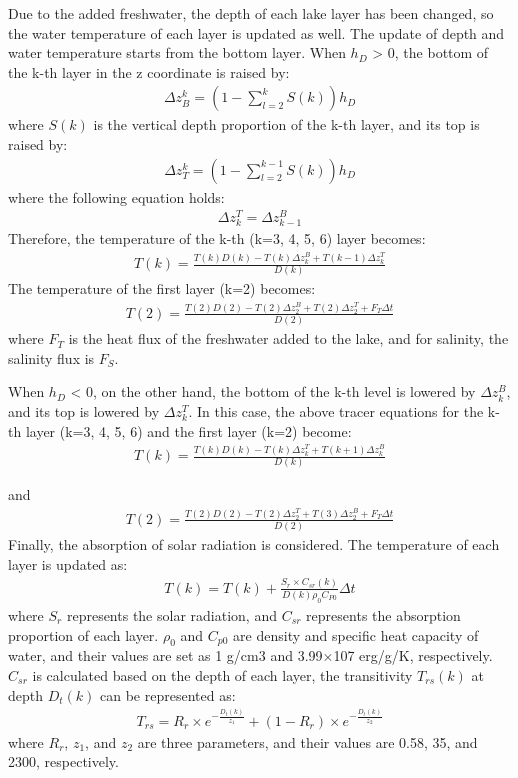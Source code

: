 Due to the added freshwater, the depth of each lake layer has been changed, so the water temperature of each layer is updated as well. The update of depth and water temperature starts from the bottom
layer. When \(h_{D}\) \textgreater{} 0, the bottom of the k-th layer in the z coordinate is raised by: \begin{eqnarray}
\Delta z_{B}^{k}=(1-\sum_{l=2}^{k}S(k))h_{D}
\end{eqnarray} where \(S(k)\) is the vertical depth proportion of the k-th layer, and its top is raised by: \begin{eqnarray}
\Delta z_{T}^{k}=(1-\sum_{l=2}^{k-1}S(k))h_{D}
\end{eqnarray} where the following equation holds: \begin{eqnarray}
\Delta z_{k}^{T}=\Delta z_{k-1}^{B}
\end{eqnarray} Therefore, the temperature of the k-th (k=3, 4, 5, 6) layer becomes: \begin{eqnarray}
T(k)=\frac{T(k)D(k)-T(k)\Delta z_{k}^{B}+T(k-1)\Delta z_{k}^{T}}{D(k)}
\end{eqnarray} The temperature of the first layer (k=2) becomes: \begin{eqnarray}
T(2)=\frac{T(2)D(2)-T(2)\Delta z_{2}^{B}+T(2)\Delta z_{2}^{T}+F_{T}\Delta t}{D(2)}
\end{eqnarray} where \(F_{T}\) is the heat flux of the freshwater added to the lake, and for salinity, the salinity flux is \(F_{S}\).

When \(h_{D}\) \textless{} 0, on the other hand, the bottom of the k-th level is lowered by \(\Delta z_{k}^{B}\), and its top is lowered by \(\Delta z_{k}^{T}\). In this case, the above tracer
equations for the k-th layer (k=3, 4, 5, 6) and the first layer (k=2) become: \begin{eqnarray}
T(k)=\frac{T(k)D(k)-T(k)\Delta z_{k}^{T}+T(k+1)\Delta z_{k}^{B}}{D(k)}
\end{eqnarray}

and \begin{eqnarray}
T(2)=\frac{T(2)D(2)-T(2)\Delta z_{2}^{T}+T(3)\Delta z_{2}^{B}+F_{T}\Delta t}{D(2)}
\end{eqnarray} Finally, the absorption of solar radiation is considered. The temperature of each layer is updated as: \begin{eqnarray}
T(k)=T(k)+\frac{S_{r}\times C_{sr}(k)}{D(k)\rho _{0}C_{P0}}\Delta t
\end{eqnarray} where \(S_{r}\) represents the solar radiation, and \(C_{sr}\) represents the absorption proportion of each layer. \(\rho_{0}\) and \(C_{p0}\) are density and specific heat capacity of water, and
their values are set as 1 g/cm3 and 3.99×107 erg/g/K, respectively. \(C_{sr}\) is calculated based on the depth of each layer, the transitivity \(T_{rs}(k)\) at depth \(D_{t}(k)\) can be represented
as: \begin{eqnarray}
T_{rs}=R_{r}\times e^{-\frac{D_{t}(k)}{z_{1}}}+(1-R_{r})\times e^{-\frac{D_{t}(k)}{z_{2}}}
\end{eqnarray} where \(R_{r}\), \(z_{1}\), and \(z_{2}\) are three parameters, and their values are 0.58, 35, and 2300, respectively.

